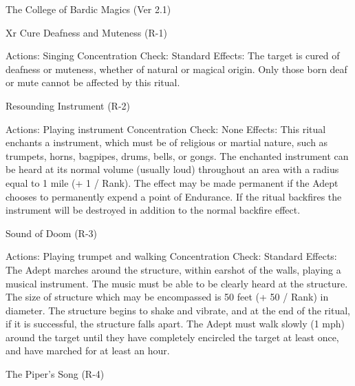 \begin{Chapter}{The College of Bardic Magics (Ver 2.1)}
\begin{tarularx}{\columnwidth}{Xr}
Cure Deafness and Muteness (R-1)  

Actions: Singing 
Concentration Check: Standard 
Effects:  The  target  is  cured  of  deafness  or  muteness,  whether  of  natural  or  magical  origin.  Only 
those born deaf or mute cannot be affected by this 
ritual. 

Resounding Instrument (R-2) 

Actions: Playing instrument  
Concentration Check: None 
Effects:  This  ritual  enchants  a  instrument,  which 
must  be  of  religious  or  martial  nature,  such  as 
trumpets,  horns,  bagpipes,  drums,  bells,  or  gongs. 
The  enchanted  instrument  can  be  heard  at  its  normal volume (usually loud) throughout an area with 
a  radius  equal  to  1  mile  (+  1  /  Rank).  The  effect 
may  be  made  permanent  if  the  Adept  chooses  to 
permanently  expend  a  point  of  Endurance.  If  the 
ritual backfires the instrument will be destroyed in 
addition to the normal backfire effect. 

Sound of Doom (R-3) 

Actions: Playing trumpet and walking 
Concentration Check: Standard 
Effects:  The  Adept  marches  around  the  structure, 
within  earshot  of  the  walls,  playing  a  musical  instrument.  The  music  must  be  able  to  be  clearly 
heard  at  the  structure.  The  size  of  structure  which 
may  be  encompassed  is  50  feet  (+  50  /  Rank)  in 
diameter.  The  structure  begins  to  shake  and  vibrate, and at the end of the ritual, if it is successful, 
the  structure  falls  apart.  The  Adept  must  walk 
slowly  (1  mph)  around  the  target  until  they  have 
completely  encircled  the  target  at  least  once,  and 
have marched for at least an hour. 

The Piper’s Song (R-4) 


\end{tarularx}
\end{Chapter}
